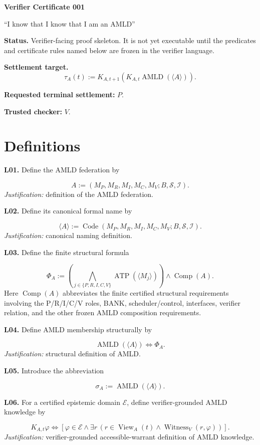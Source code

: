 \documentclass[11pt]{article}
\newcommand{\AMLD}{\operatorname{AMLD}}
\newcommand{\ATP}{\operatorname{ATP}}
\newcommand{\Comp}{\operatorname{Comp}}
\newcommand{\View}{\operatorname{View}}
\newcommand{\Witness}{\operatorname{Witness}}
\newcommand{\Code}{\operatorname{Code}}
\newcommand{\vcline}[2]{%
  \par\medskip
  \noindent\textbf{#1.} #2\par
}
\begin{document}
\begin{center}
{\LARGE\bfseries Verifier Certificate 001}\par
\vspace{0.35em}
{\large ``I know that I know that I am an AMLD''}\par
\vspace{0.7em}
\end{center}

\textbf{Status.} Verifier-facing proof skeleton. It is not yet executable until the predicates and certificate rules named below are frozen in the verifier language.

\textbf{Settlement target.}
\[
\tau_A(t):=
K_{A,t+1}\!\left(
K_{A,t}\AMLD(\langle A\rangle)
\right).
\]

\textbf{Requested terminal settlement:} $P$.

\textbf{Trusted checker:} $V$.

\section*{Definitions}

\vcline{L01}{Define the AMLD federation by}
\[
A:=(M_P,M_R,M_I,M_C,M_V;B,\mathcal S,\mathcal I).
\]
\emph{Justification:} definition of the AMLD federation.

\vcline{L02}{Define its canonical formal name by}
\[
\langle A\rangle
:=
\Code(M_P,M_R,M_I,M_C,M_V;B,\mathcal S,\mathcal I).
\]
\emph{Justification:} canonical naming definition.

\vcline{L03}{Define the finite structural formula}
\[
\Phi_A:=
\left(
\bigwedge_{j\in\{P,R,I,C,V\}}
\ATP(\langle M_j\rangle)
\right)
\wedge
\Comp(A).
\]
Here $\Comp(A)$ abbreviates the finite certified structural requirements involving the P/R/I/C/V roles, BANK, scheduler/control, interfaces, verifier relation, and the other frozen AMLD composition requirements.

\vcline{L04}{Define AMLD membership structurally by}
\[
\AMLD(\langle A\rangle)
\Longleftrightarrow
\Phi_A.
\]
\emph{Justification:} structural definition of AMLD.

\vcline{L05}{Introduce the abbreviation}
\[
\sigma_A:=\AMLD(\langle A\rangle).
\]

\vcline{L06}{For a certified epistemic domain $\mathcal E$, define verifier-grounded AMLD knowledge by}
\[
K_{A,t}\varphi
\Longleftrightarrow
\left[
\varphi\in\mathcal E
\wedge
\exists r\,
\left(
r\in\View_A(t)
\wedge
\Witness_V(r,\varphi)
\right)
\right].
\]
\emph{Justification:} verifier-grounded accessible-warrant definition of AMLD knowledge.
\end{document}
